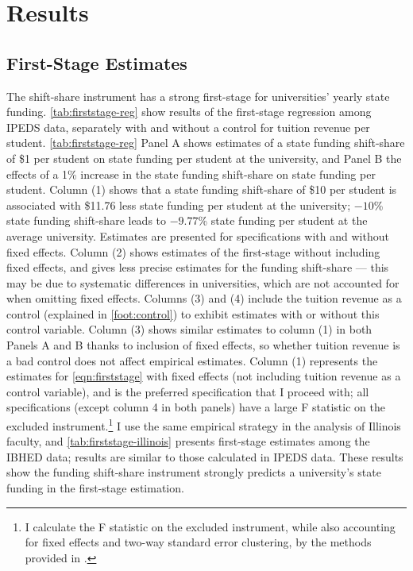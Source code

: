 \section{Results}
\label{sec:results}

\subsection{First-Stage Estimates}
The shift-share instrument has a strong first-stage for universities' yearly state funding.
\autoref{tab:firststage-reg} show results of the first-stage regression among IPEDS data, separately with and without a control for tuition revenue per student.
\autoref{tab:firststage-reg} Panel A shows estimates of a state funding shift-share of \$1 per student on state funding per student at the university, and Panel B the effects of a 1\% increase in the state funding shift-share on state funding per student.
Column (1) shows that a state funding shift-share of \$10 per student is associated with \$11.76 less state funding per student at the university; $-10$\% state funding shift-share leads to $-9.77$\% state funding per student at the average university.
Estimates are presented for specifications with and without fixed effects.
Column (2) shows estimates of the first-stage without including fixed effects, and gives less precise estimates for the funding shift-share --- this may be due to systematic differences in universities, which are not accounted for when omitting fixed effects.
Columns (3) and (4) include the tuition revenue as a control (explained in \autoref{foot:control}) to exhibit estimates with or without this control variable.
Column (3) shows similar estimates to column (1) in both Panels A and B thanks to inclusion of fixed effects, so whether tuition revenue is a bad control does not affect empirical estimates.
Column (1) represents the estimates for \autoref{eqn:firststage} with fixed effects (not including tuition revenue as a control variable), and is the preferred specification that I proceed with;
all specifications (except column 4 in both panels) have a large F statistic on the excluded instrument.\footnote{
    I calculate the F statistic on the excluded instrument, while also accounting for fixed effects and two-way standard error clustering, by the methods provided in \cite{olea2013robust}.
}
I use the same empirical strategy in the analysis of Illinois faculty, and \autoref{tab:firststage-illinois} presents first-stage estimates among the IBHED data; results are similar to those calculated in IPEDS data.
These results show the funding shift-share instrument strongly predicts a university's state funding in the first-stage estimation.

